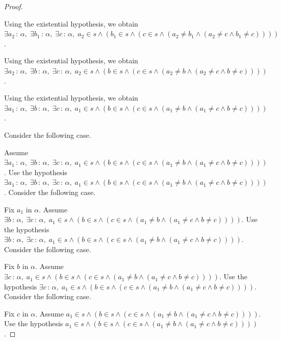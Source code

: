 \documentclass{article}
\theoremstyle{paperresult}
\newenvironment{proofstep}{\par\smallskip\ifdim\leftskip<3em\relax\advance\leftskip by 1em\relax\fi\noindent\ignorespaces}{\par\smallskip}
\begin{document}
\begin{proof}
\begin{proofstep}
\begin{proofstep}
\begin{proofstep}
\begin{proofstep}
\end{proofstep}
Using the existential hypothesis, we obtain \(\exists a_{2}\, :\, \alpha,\; \exists b_{1}\, :\, \alpha,\; \exists c\, :\, \alpha,\; a_{2} \in s \land (b_{1} \in s \land (c \in s \land (a_{2} \ne b_{1} \land (a_{2} \ne c \land b_{1} \ne c))))\).
\end{proofstep}
Using the existential hypothesis, we obtain \(\exists a_{2}\, :\, \alpha,\; \exists b\, :\, \alpha,\; \exists c\, :\, \alpha,\; a_{2} \in s \land (b \in s \land (c \in s \land (a_{2} \ne b \land (a_{2} \ne c \land b \ne c))))\).
\end{proofstep}
Using the existential hypothesis, we obtain \(\exists a_{1}\, :\, \alpha,\; \exists b\, :\, \alpha,\; \exists c\, :\, \alpha,\; a_{1} \in s \land (b \in s \land (c \in s \land (a_{1} \ne b \land (a_{1} \ne c \land b \ne c))))\).
\end{proofstep}
Consider the following case.
\begin{proofstep}
Assume \(\exists a_{1}\, :\, \alpha,\; \exists b\, :\, \alpha,\; \exists c\, :\, \alpha,\; a_{1} \in s \land (b \in s \land (c \in s \land (a_{1} \ne b \land (a_{1} \ne c \land b \ne c))))\).
Use the hypothesis \(\exists a_{1}\, :\, \alpha,\; \exists b\, :\, \alpha,\; \exists c\, :\, \alpha,\; a_{1} \in s \land (b \in s \land (c \in s \land (a_{1} \ne b \land (a_{1} \ne c \land b \ne c))))\).
Consider the following case.
\begin{proofstep}
Fix \(a_{1}\) in \(\alpha\).
Assume \(\exists b\, :\, \alpha,\; \exists c\, :\, \alpha,\; a_{1} \in s \land (b \in s \land (c \in s \land (a_{1} \ne b \land (a_{1} \ne c \land b \ne c))))\).
Use the hypothesis \(\exists b\, :\, \alpha,\; \exists c\, :\, \alpha,\; a_{1} \in s \land (b \in s \land (c \in s \land (a_{1} \ne b \land (a_{1} \ne c \land b \ne c))))\).
Consider the following case.
\begin{proofstep}
Fix \(b\) in \(\alpha\).
Assume \(\exists c\, :\, \alpha,\; a_{1} \in s \land (b \in s \land (c \in s \land (a_{1} \ne b \land (a_{1} \ne c \land b \ne c))))\).
Use the hypothesis \(\exists c\, :\, \alpha,\; a_{1} \in s \land (b \in s \land (c \in s \land (a_{1} \ne b \land (a_{1} \ne c \land b \ne c))))\).
Consider the following case.
\begin{proofstep}
Fix \(c\) in \(\alpha\).
Assume \(a_{1} \in s \land (b \in s \land (c \in s \land (a_{1} \ne b \land (a_{1} \ne c \land b \ne c))))\).
Use the hypothesis \(a_{1} \in s \land (b \in s \land (c \in s \land (a_{1} \ne b \land (a_{1} \ne c \land b \ne c))))\).

\end{proofstep}
\end{proofstep}
\end{proofstep}
\end{proofstep}
\end{proof}
\end{document}
